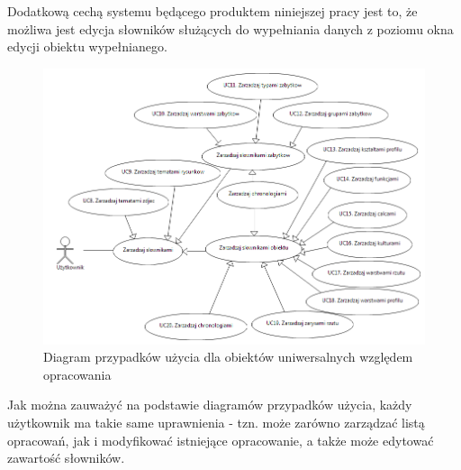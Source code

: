 Dodatkową cechą systemu będącego produktem niniejszej pracy jest to, że możliwa jest edycja słowników służących do wypełniania danych z poziomu okna edycji obiektu wypełnianego.
\newpage
\begin{figure} [H]
    \begin{center}
	\includegraphics[scale=.5]{img/useCasesZarzadzanieSlownikami.png}
	\caption{Diagram przypadków użycia dla obiektów uniwersalnych względem opracowania}
	\label{useCasesDiag2}
    \end{center}
\end{figure}

Jak można zauważyć na podstawie diagramów przypadków użycia, każdy użytkownik ma takie same uprawnienia - tzn. może zarówno zarządzać listą opracowań, jak i modyfikować istniejące opracowanie, a także może edytować zawartość słowników.

